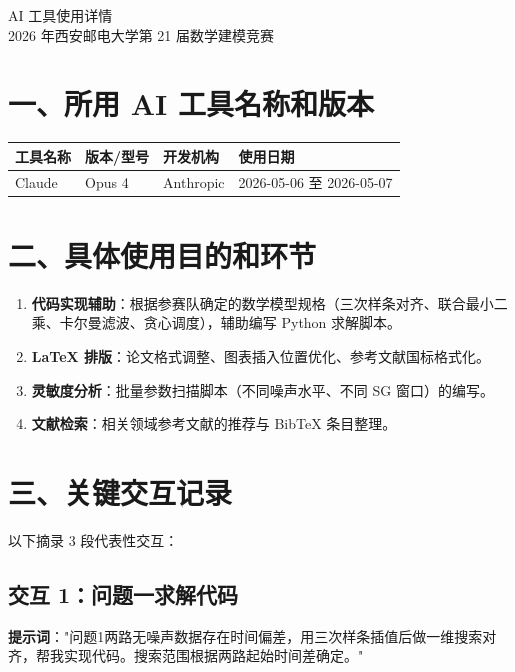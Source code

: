 \documentclass[a4paper, 12pt]{ctexart}
\begin{document}
\begin{center}
{\heiti{} AI 工具使用详情}\\[1em]
{ 2026 年西安邮电大学第 21 届数学建模竞赛}
\end{center}

\vspace{1.5em}

\section*{一、所用 AI 工具名称和版本}

\begin{table}[h]
\centering
\begin{tabular}{@{}llll@{}}
\toprule
工具名称 & 版本/型号 & 开发机构 & 使用日期 \\
\midrule
Claude & Opus 4 & Anthropic & 2026-05-06 至 2026-05-07 \\
\bottomrule
\end{tabular}
\end{table}

\section*{二、具体使用目的和环节}

\begin{enumerate}[leftmargin=2em]
\item \textbf{代码实现辅助}：根据参赛队确定的数学模型规格（三次样条对齐、联合最小二乘、卡尔曼滤波、贪心调度），辅助编写 Python 求解脚本。
\item \textbf{LaTeX 排版}：论文格式调整、图表插入位置优化、参考文献国标格式化。
\item \textbf{灵敏度分析}：批量参数扫描脚本（不同噪声水平、不同 SG 窗口）的编写。
\item \textbf{文献检索}：相关领域参考文献的推荐与 BibTeX 条目整理。
\end{enumerate}

\section*{三、关键交互记录}

以下摘录 3 段代表性交互：

\subsection*{交互 1：问题一求解代码}

\textbf{提示词}："问题1两路无噪声数据存在时间偏差，用三次样条插值后做一维搜索对齐，帮我实现代码。搜索范围根据两路起始时间差确定。"
\end{document}
